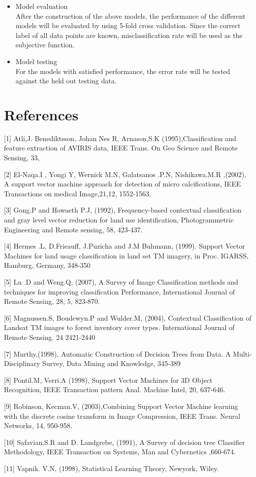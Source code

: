 \documentclass[11pt]{article}
\begin{document}
\begin{itemize}
	\item Model evaluation \\
	After the construction of the above models, the performance of the different models will be evaluated by using 5-fold cross validation. Since the correct label of all data points are known, misclassification rate will be used as the subjective function.
	\item Model testing \\
	For the models with satisfied performance, the error rate will be tested against the held out testing data.\\
	
\end{itemize}

\section*{References}
[1] Atli,J. Benediktsson, Johan Nes R, Arnason,S.K (1995),Classification and feature extraction of AVIRIS data, IEEE Trans. On Geo Science and Remote Sensing, 33, 

[2] El-Naqa.I , Yongi Y, Wernick M.N, Galatsanos .P.N, Nishikawa.M.R ,(2002), A support vector machine approach for detection of micro calcifications, IEEE Transactions on medical Image,21,12, 1552-1563. 

[3] Gong.P and Howaeth P.J, (1992), Frequency-based contextual classification and gray level vector reduction for land use identification, Photogrammetric Engineering and Remote sensing, 58, 423-437. 

[4] Hermes .L, D.Frieauff, J.Puzicha and J.M Buhmann, (1999). Support Vector Machines for land usage classification in land set TM imagery, in Proc. IGARSS, Hamburg, Germany, 348-350 

[5] Lu .D and Weng.Q, (2007), A Survey of Image Classification methods and techniques for improving classification Performance, International Journal of Remote Sensing, 28, 5, 823-870.
 
[6] Magnussen.S, Boudewyn.P and Wulder.M, (2004), Contextual Classification of Landsat TM images to forest inventory cover types. International Journal of Remote Sensing. 24 2421-2440 

[7] Murthy,(1998), Automatic Construction of Decision Trees from Data. A Multi-Disciplinary Survey, Data Mining and Knowledge, 345-389

[8] Pontil.M, Verri.A (1998), Support Vector Machines for 3D Object Recognition, IEEE Transaction pattern Anal. Machine Intel, 20, 637-646. 

[9] Robinson, Kecman.V, (2003),Combining Support Vector Machine learning with the discrete cosine transform in Image Compression, IEEE Trans. Neural Networks, 14, 950-958.

[10] Safavian.S.R and D. Landgrebe, (1991), A Survey of decision tree Classifier Methodology, IEEE Transaction on Systems, Man and Cybernetics ,660-674. 

[11] Vapnik. V.N, (1998), Statistical Learning Theory, Newyork, Wiley.

%
%
\end{document}
